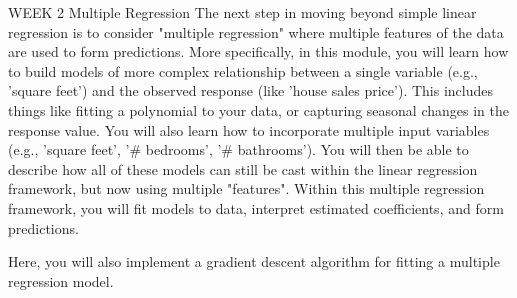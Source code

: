 WEEK 2
Multiple Regression
The next step in moving beyond simple linear regression is to consider "multiple regression" where multiple features of the data are used to form predictions.
More specifically, in this module, you will learn how to build models of more complex relationship between a single variable (e.g., 'square feet') and the observed response (like 'house sales price'). This includes things like fitting a polynomial to your data, or capturing seasonal changes in the response value. You will also learn how to incorporate multiple input variables (e.g., 'square feet', '# bedrooms', '# bathrooms'). You will then be able to describe how all of these models can still be cast within the linear regression framework, but now using multiple "features". Within this multiple regression framework, you will fit models to data, interpret estimated coefficients, and form predictions.

Here, you will also implement a gradient descent algorithm for fitting a multiple regression model.

